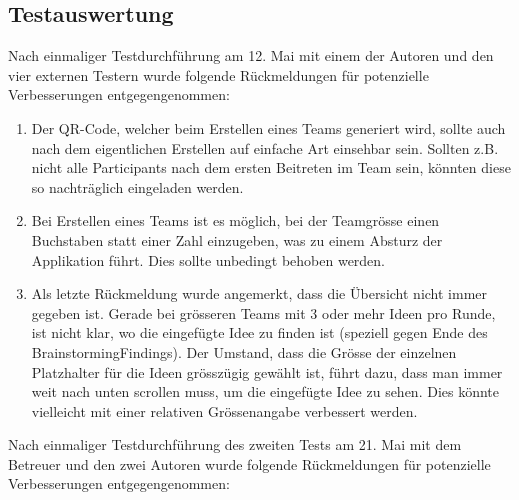 \subsection{Testauswertung}
\label{subsec:testauswertung}
Nach einmaliger Testdurchführung am 12. Mai mit einem der Autoren und den vier externen Testern wurde folgende Rück\-mel\-dun\-gen für potenzielle Verbesserungen entgegengenommen:

\begin{enumerate}
	\item Der QR-Code, welcher beim Erstellen eines Teams generiert wird, sollte auch nach dem eigentlichen Erstellen auf einfache Art einsehbar sein. Sollten z.B. nicht alle Participants nach dem ersten Beitreten im Team sein, könnten diese so nachträglich eingeladen werden.
	\item Bei Erstellen eines Teams ist es möglich, bei der Teamgrösse einen Buchstaben statt einer Zahl einzugeben, was zu einem Absturz der Applikation führt. Dies sollte unbedingt behoben werden.
	\item Als letzte Rückmeldung wurde angemerkt, dass die Übersicht nicht immer gegeben ist. Gerade bei grösseren Teams mit 3 oder mehr Ideen pro Runde, ist nicht klar, wo die eingefügte Idee zu finden ist (speziell gegen Ende des BrainstormingFindings). Der Umstand, dass die Grösse der einzelnen Platzhalter für die Ideen grösszügig gewählt ist, führt dazu, dass man immer weit nach unten scrollen muss, um die eingefügte Idee zu sehen. Dies könnte vielleicht mit einer relativen Grössenangabe verbessert werden.
\end{enumerate}

Nach einmaliger Testdurchführung des zweiten Tests am 21. Mai mit dem Betreuer und den zwei Autoren wurde folgende Rück\-mel\-dun\-gen für potenzielle Verbesserungen entgegengenommen:

